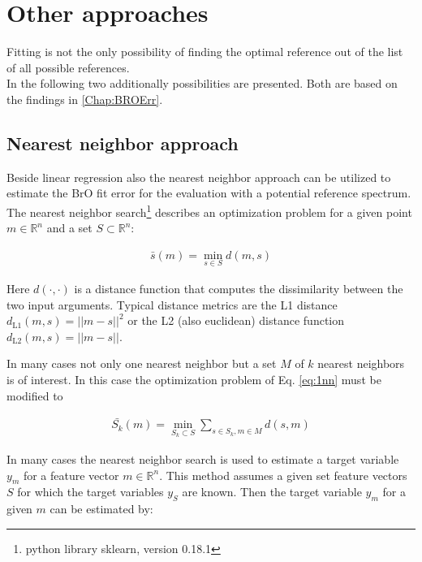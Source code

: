 \documentclass  [
  paper    = a4,
  BCOR     = 10mm,
  twoside,
  fontsize = 12pt,
  fleqn,
  toc      = bibnumbered,
  toc      = listofnumbered,
  numbers  = noendperiod,
  headings = normal,
  listof   = leveldown,
  version  = 3.03
]                                       {scrreprt}
\begin{document}
	\section{Other approaches}

	Fitting is not the only possibility of finding the optimal reference out of the list of all possible references.\\
	In the following two additionally possibilities are presented. Both are based on the findings in \cref{Chap:BROErr}. 

\subsection{Nearest neighbor approach}


Beside linear regression also the nearest neighbor approach can be utilized to estimate the BrO fit error for the evaluation with a potential reference spectrum.
%
The nearest neighbor search\footnote{python library sklearn, version 0.18.1} describes an optimization problem for a given point $m \in \mathbb{R}^n$ and a set $S \subset \mathbb{R}^n$:

%

\begin{align}
\bar{s}(m) = \min_{s \in S} d(m, s) \label{eq:1nn}
\end{align}

%
Here $d(\cdot, \cdot)$ is a distance function that computes the dissimilarity between the two input arguments. Typical distance metrics are the L1 distance $d_{\text{L1} 	
}(m, s) = ||m - s||^2$ or the L2 (also euclidean) distance function $d_{\text{L2} 
}(m, s) = ||m - s||$. 


In many cases not only one nearest neighbor but a set $M$ of $k$ nearest neighbors is of interest. In this case the optimization problem of Eq. \ref{eq:1nn} must be modified to

%

\begin{align}
\bar{S_k}(m) = \min_{S_k \subset S} \sum_{s \in S_k, m \in M} d(s, m) \label{eq:knn}
\end{align}

%

In many cases the nearest neighbor search is used to estimate a target variable $y_m$ for a feature vector $m \in \mathbb{R}^n$. This method assumes a given set feature vectors $S$ for which the target variables $y_S$ are known. Then the target variable $y_m$ for a given $m$ can be estimated by:
\end{document}
